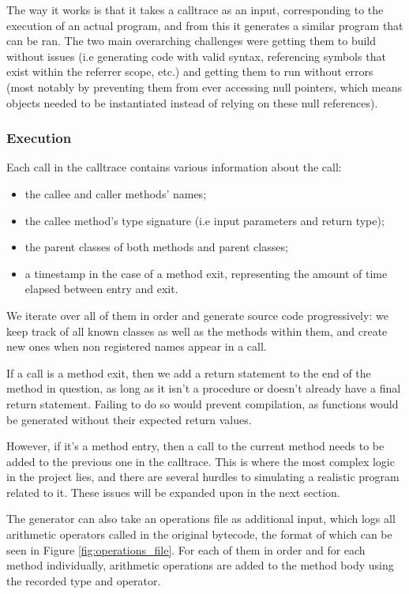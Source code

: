 \documentclass[12pt]{article}
\begin{document}
The way it works is that it takes a calltrace as an input, corresponding to the execution of an actual program, and from this it generates a similar program that can be ran. The two main overarching challenges were getting them to build without issues (i.e generating code with valid syntax, referencing symbols that exist within the referrer scope, etc.) and getting them to run without errors (most notably by preventing them from ever accessing null pointers, which means objects needed to be instantiated instead of relying on these null references).

\subsubsection{Execution}
Each call in the calltrace contains various information about the call:
\begin{itemize}
	\item the callee and caller methods' names;
	\item the callee method's type signature (i.e input parameters and return type);
	\item the parent classes of both methods and parent classes;
	\item a timestamp in the case of a method exit, representing the amount of time elapsed between entry and exit.
\end{itemize}

We iterate over all of them in order and generate source code progressively: we keep track of all known classes as well as the methods within them, and create new ones when non registered names appear in a call.

If a call is a method exit, then we add a return statement to the end of the method in question, as long as it isn't a procedure or doesn't already have a final return statement. Failing to do so would prevent compilation, as functions would be generated without their expected return values.

However, if it's a method entry, then a call to the current method needs to be added to the previous one in the calltrace. This is where the most complex logic in the project lies, and there are several hurdles to simulating a realistic program related to it. These issues will be expanded upon in the next section.

The generator can also take an operations file as additional input, which logs all arithmetic operators called in the original bytecode, the format of which can be seen in Figure \ref{fig:operations_file}. For each of them in order and for each method individually, arithmetic operations are added to the method body using the recorded type and operator.
\end{document}
